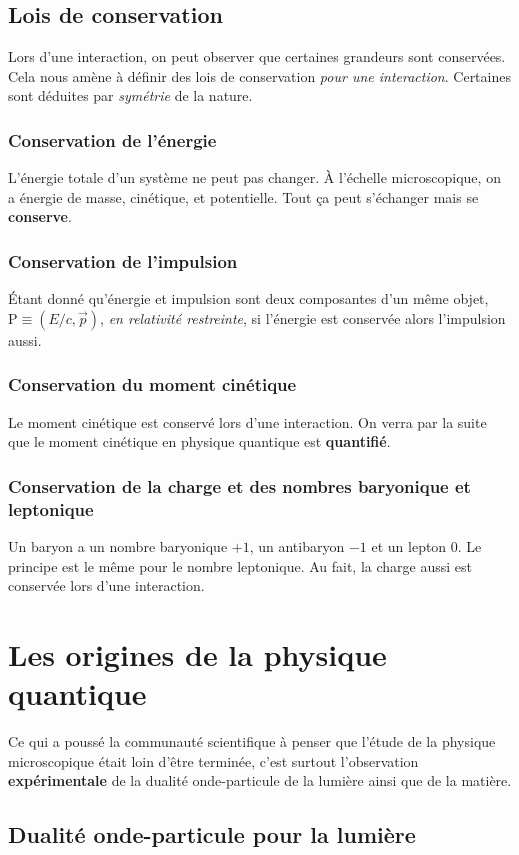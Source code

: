 \documentclass[11pt]{book}
\begin{document}
\section{Lois de conservation}
Lors d'une interaction, on peut observer que certaines grandeurs sont conservées. Cela nous amène à définir des lois de conservation \textit{pour une interaction}. Certaines sont déduites par \textit{symétrie} de la nature.
\subsection{Conservation de l'énergie}
L'énergie totale d'un système ne peut pas changer. À l'échelle microscopique, on a énergie de masse, cinétique, et potentielle. Tout ça peut s'échanger mais se \textbf{conserve}.
\subsection{Conservation de l'impulsion}
Étant donné qu'énergie et impulsion sont deux composantes d'un même objet, $\mathrm{P} \equiv (E/c, \vec{p})$, \textit{en relativité restreinte}, si l'énergie est conservée alors l'impulsion aussi.
\subsection{Conservation du moment cinétique}
Le moment cinétique est conservé lors d'une interaction. On verra par la suite que le moment cinétique en physique quantique est \textbf{quantifié}.
\subsection{Conservation de la charge et des nombres baryonique et leptonique}
Un baryon a un nombre baryonique $+1$, un antibaryon $-1$ et un lepton $0$. Le principe est le même pour le nombre leptonique. Au fait, la charge aussi est conservée lors d'une interaction.

\chapter{Les origines de la physique quantique}
Ce qui a poussé la communauté scientifique à penser que l'étude de la physique microscopique était loin d'être terminée, c'est surtout l'observation \textbf{expérimentale} de la dualité onde-particule de la lumière ainsi que de la matière.
\section{Dualité onde-particule pour la lumière}
\end{document}
